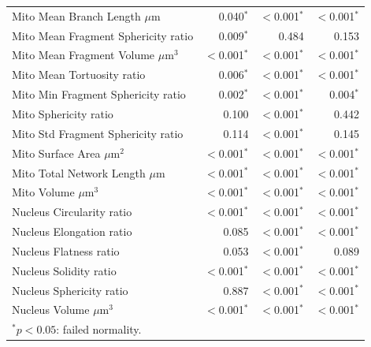 \documentclass[11pt,a4paper]{article}
\begin{document}
\begin{longtable}{lrrr}
  Mito Mean Branch Length $\mu$m & 0.040$^{*}$ & $<$0.001$^{*}$ & $<$0.001$^{*}$ \\
  Mito Mean Fragment Sphericity ratio & 0.009$^{*}$ & 0.484 & 0.153 \\
  Mito Mean Fragment Volume $\mu$m$^{3}$ & $<$0.001$^{*}$ & $<$0.001$^{*}$ & $<$0.001$^{*}$ \\
  Mito Mean Tortuosity ratio & 0.006$^{*}$ & $<$0.001$^{*}$ & $<$0.001$^{*}$ \\
  Mito Min Fragment Sphericity ratio & 0.002$^{*}$ & $<$0.001$^{*}$ & 0.004$^{*}$ \\
  Mito Sphericity ratio & 0.100 & $<$0.001$^{*}$ & 0.442 \\
  Mito Std Fragment Sphericity ratio & 0.114 & $<$0.001$^{*}$ & 0.145 \\
  Mito Surface Area $\mu$m$^{2}$ & $<$0.001$^{*}$ & $<$0.001$^{*}$ & $<$0.001$^{*}$ \\
  Mito Total Network Length $\mu$m & $<$0.001$^{*}$ & $<$0.001$^{*}$ & $<$0.001$^{*}$ \\
  Mito Volume $\mu$m$^{3}$ & $<$0.001$^{*}$ & $<$0.001$^{*}$ & $<$0.001$^{*}$ \\
  Nucleus Circularity ratio & $<$0.001$^{*}$ & $<$0.001$^{*}$ & $<$0.001$^{*}$ \\
  Nucleus Elongation ratio & 0.085 & $<$0.001$^{*}$ & $<$0.001$^{*}$ \\
  Nucleus Flatness ratio & 0.053 & $<$0.001$^{*}$ & 0.089 \\
  Nucleus Solidity ratio & $<$0.001$^{*}$ & $<$0.001$^{*}$ & $<$0.001$^{*}$ \\
  Nucleus Sphericity ratio & 0.887 & $<$0.001$^{*}$ & $<$0.001$^{*}$ \\
  Nucleus Volume $\mu$m$^{3}$ & $<$0.001$^{*}$ & $<$0.001$^{*}$ & $<$0.001$^{*}$ \\
\bottomrule
\multicolumn{4}{l}{\footnotesize $^{*}p < 0.05$: failed normality.} \\
\end{longtable}
\end{document}
